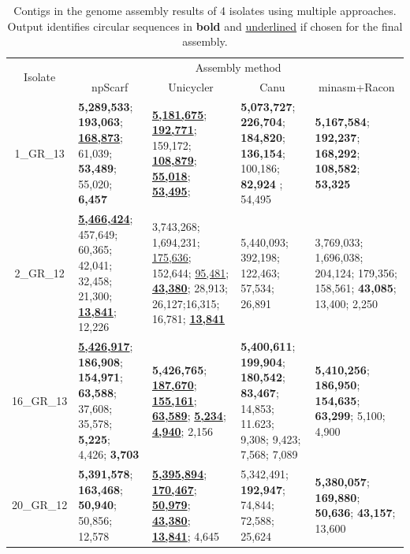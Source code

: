 \begin{landscape}
\begin{table}[!hpt]
\centering
\small
\caption[Genome assembly results using multiple approaches.]{Contigs in the genome assembly results of 4 \kp{} isolates using multiple approaches. Output identifies circular sequences in \textbf{bold} and \underline{underlined} if chosen for the final assembly.}
\label{tab:assers}
\begin{tabular}{|c|p{4cm}|p{4cm}|p{4cm}|p{4cm}|}
\hline
\multirow{2}{*}{Isolate} & \multicolumn{4}{c|}{Assembly method}\\ \cline{2-5} 
                        & \multicolumn{1}{c|}{npScarf}  & \multicolumn{1}{c|}{Unicycler}    & \multicolumn{1}{c|}{Canu} & \multicolumn{1}{c|}{minasm+Racon} \\ \hline
1\_GR\_13               & \textbf{5,289,533}; \textbf{193,063}; \underline{\textbf{168,873}}; 61,039; \textbf{53,489}; 55,020; \textbf{6,457}              & \underline{\textbf{5,181,675}}; \underline{\textbf{192,771}}; 159,172; \underline{\textbf{108,879}}; \underline{\textbf{55,018}}; \underline{\textbf{53,495}};                                                        & \textbf{5,073,727}; \textbf{226,704}; \textbf{184,820}; \textbf{136,154}; 100,186; \textbf{82,924 }; 54,495       & \textbf{5,167,584}; \textbf{192,237}; \textbf{168,292}; \textbf{108,582}; \textbf{53,325}                                \\ \hline
2\_GR\_12               & \underline{\textbf{5,466,424}}; 457,649; 60,365; 42,041; 32,458; 21,300; \underline{\textbf{13,841}}; 12,226 & 3,743,268; 1,694,231; \underline{175,636}; 152,644; \underline{95,481}; \underline{\textbf{43,380}}; 28,913; 26,127;16,315; 16,781; \underline{\textbf{13,841}} & 5,440,093; 392,198; 122,463; 57,534; 26,891   & 3,769,033; 1,696,038; 204,124; 179,356; 158,561; \textbf{43,085}; 13,400; 2,250 \\ \hline
16\_GR\_13              & \underline{\textbf{5,426,917}}; \textbf{186,908}; \textbf{154,971}; \textbf{63,588}; 37,608; 35,578; \textbf{5,225}; 4,426; \textbf{3,703}   & \textbf{5,426,765}; \underline{\textbf{187,670}}; \underline{\textbf{155,161}}; \underline{\textbf{63,589}}; \underline{\textbf{5,234}}; \underline{\textbf{4,940}}; 2,156  & \textbf{5,400,611}; \textbf{199,904}; \textbf{180,542}; \textbf{83,467}; 14,853; 11.623; 9,308; 9,423; 7,568; 7,089 & \textbf{5,410,256}; \textbf{186,950}; \textbf{154,635}; \textbf{63,299}; 5,100; 4,900  \\ \hline
20\_GR\_12              & \textbf{5,391,578}; \textbf{163,468}; \textbf{50,940}; 50,856; 12,578  & \underline{\textbf{5,395,894}}; \underline{\textbf{170,467}}; \underline{\textbf{50,979}}; \underline{\textbf{43,380}}; \underline{\textbf{13,841}}; 4,645     & 5,342,491; \textbf{192,947}; 74,844; 72,588; 25,624    & \textbf{5,380,057}; \textbf{169,880}; \textbf{50,636}; \textbf{43,157}; 13,600  \\ \hline
\end{tabular}
\end{table}
\end{landscape}

